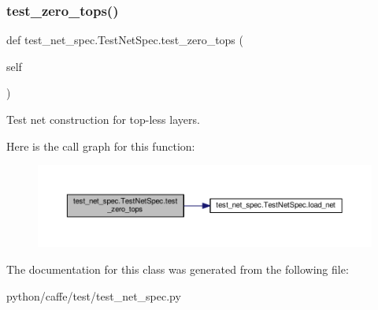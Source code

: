 \subsubsection{\texorpdfstring{test\+\_\+zero\+\_\+tops()}{test\_zero\_tops()}}
{\footnotesize\ttfamily def test\+\_\+net\+\_\+spec.\+Test\+Net\+Spec.\+test\+\_\+zero\+\_\+tops (\begin{DoxyParamCaption}\item[{}]{self }\end{DoxyParamCaption})}

\begin{DoxyVerb}Test net construction for top-less layers.\end{DoxyVerb}
 Here is the call graph for this function\+:
\nopagebreak
\begin{figure}[H]
\begin{center}
\leavevmode
\includegraphics[width=350pt]{classtest__net__spec_1_1_test_net_spec_a91021c09c7d6750cba8a8a1a05749ad6_cgraph}
\end{center}
\end{figure}


The documentation for this class was generated from the following file\+:\begin{DoxyCompactItemize}
\item 
python/caffe/test/test\+\_\+net\+\_\+spec.\+py\end{DoxyCompactItemize}
